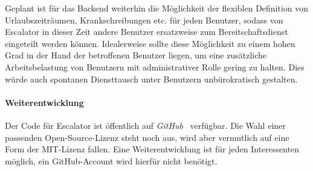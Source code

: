\documentclass[11pt,utf8,notoc,bibnum,german,final]{zihpub}
\begin{document}
Geplant ist für das Backend weiterhin die Möglichkeit der flexiblen Definition
von Urlaubszeiträumen, Krankschreibungen etc. für jeden Benutzer, sodass von
Escalator in dieser Zeit andere Benutzer ersatzweise zum Bereitschaftsdienst
eingeteilt werden können. Idealerweise sollte diese Möglichkeit zu einem hohen
Grad in der Hand der betroffenen Benutzer liegen, um eine zusätzliche
Arbeitsbelastung von Benutzern mit administrativer Rolle gering zu halten. Dies
würde auch spontanen Diensttausch unter Benutzern unbürokratisch gestalten.


\paragraph{Weiterentwicklung}

Der Code für Escalator ist öffentlich auf \emph{GitHub}~\cite{escalator-github}
verfügbar. Die Wahl einer passenden Open-Source-Lizenz steht noch aus, wird
aber vermutlich auf eine Form der MIT-Lizenz fallen. Eine Weiterentwicklung ist
für jeden Interessenten möglich, ein GitHub-Account wird hierfür nicht benötigt.
\end{document}
